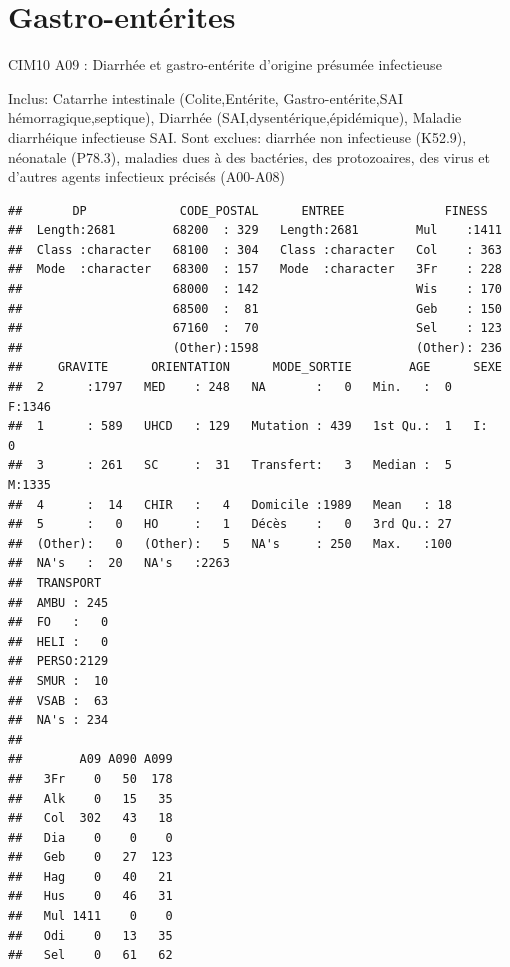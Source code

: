 \documentclass[12pt,english,french,twoside]{book}\usepackage[]{graphicx}\usepackage[]{color}
\makeatletter
\newenvironment{kframe}{%
 \def\at@end@of@kframe{}%
 \ifinner\ifhmode%
  \def\at@end@of@kframe{\end{minipage}}%
  \begin{minipage}{\columnwidth}%
 \fi\fi%
 \def\FrameCommand##1{\hskip\@totalleftmargin \hskip-\fboxsep
 \colorbox{shadecolor}{##1}\hskip-\fboxsep
     \hskip-\linewidth \hskip-\@totalleftmargin \hskip\columnwidth}%
 \MakeFramed {\advance\hsize-\width
   \@totalleftmargin\z@ \linewidth\hsize
   \@setminipage}}%
 {\par\unskip\endMakeFramed%
 \at@end@of@kframe}
\newenvironment{knitrout}{}{} %
\makeatother
\begin{document}
\section{Gastro-entérites}

CIM10 A09 : Diarrhée et gastro-entérite d'origine présumée infectieuse

Inclus: Catarrhe intestinale (Colite,Entérite, Gastro-entérite,SAI hémorragique,septique), Diarrhée (SAI,dysentérique,épidémique), Maladie diarrhéique infectieuse SAI.
Sont exclues: diarrhée non infectieuse (K52.9), néonatale (P78.3), maladies dues à des bactéries, des protozoaires, des virus et d'autres agents infectieux précisés (A00-A08)  

\begin{knitrout}
\color{fgcolor}\begin{kframe}
\begin{verbatim}
##       DP             CODE_POSTAL      ENTREE              FINESS    
##  Length:2681        68200  : 329   Length:2681        Mul    :1411  
##  Class :character   68100  : 304   Class :character   Col    : 363  
##  Mode  :character   68300  : 157   Mode  :character   3Fr    : 228  
##                     68000  : 142                      Wis    : 170  
##                     68500  :  81                      Geb    : 150  
##                     67160  :  70                      Sel    : 123  
##                     (Other):1598                      (Other): 236  
##     GRAVITE      ORIENTATION      MODE_SORTIE        AGE      SEXE    
##  2      :1797   MED    : 248   NA       :   0   Min.   :  0   F:1346  
##  1      : 589   UHCD   : 129   Mutation : 439   1st Qu.:  1   I:   0  
##  3      : 261   SC     :  31   Transfert:   3   Median :  5   M:1335  
##  4      :  14   CHIR   :   4   Domicile :1989   Mean   : 18           
##  5      :   0   HO     :   1   Décès    :   0   3rd Qu.: 27           
##  (Other):   0   (Other):   5   NA's     : 250   Max.   :100           
##  NA's   :  20   NA's   :2263                                          
##  TRANSPORT   
##  AMBU : 245  
##  FO   :   0  
##  HELI :   0  
##  PERSO:2129  
##  SMUR :  10  
##  VSAB :  63  
##  NA's : 234
##      
##        A09 A090 A099
##   3Fr    0   50  178
##   Alk    0   15   35
##   Col  302   43   18
##   Dia    0    0    0
##   Geb    0   27  123
##   Hag    0   40   21
##   Hus    0   46   31
##   Mul 1411    0    0
##   Odi    0   13   35
##   Sel    0   61   62

\end{verbatim}
\end{kframe}
\end{knitrout}
\end{document}
